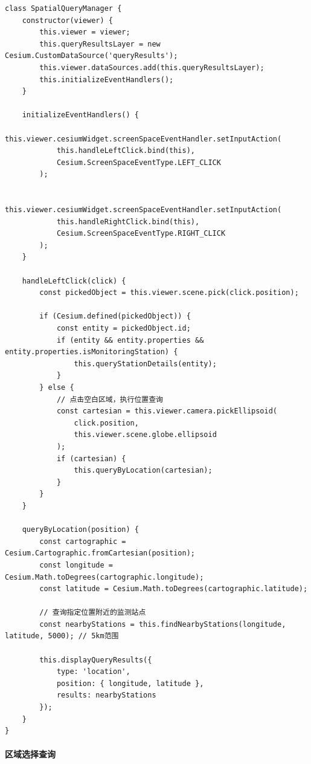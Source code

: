 \begin{lstlisting}
class SpatialQueryManager {
    constructor(viewer) {
        this.viewer = viewer;
        this.queryResultsLayer = new Cesium.CustomDataSource('queryResults');
        this.viewer.dataSources.add(this.queryResultsLayer);
        this.initializeEventHandlers();
    }
    
    initializeEventHandlers() {
        this.viewer.cesiumWidget.screenSpaceEventHandler.setInputAction(
            this.handleLeftClick.bind(this),
            Cesium.ScreenSpaceEventType.LEFT_CLICK
        );
        
        this.viewer.cesiumWidget.screenSpaceEventHandler.setInputAction(
            this.handleRightClick.bind(this),
            Cesium.ScreenSpaceEventType.RIGHT_CLICK
        );
    }
    
    handleLeftClick(click) {
        const pickedObject = this.viewer.scene.pick(click.position);
        
        if (Cesium.defined(pickedObject)) {
            const entity = pickedObject.id;
            if (entity && entity.properties && entity.properties.isMonitoringStation) {
                this.queryStationDetails(entity);
            }
        } else {
            // 点击空白区域，执行位置查询
            const cartesian = this.viewer.camera.pickEllipsoid(
                click.position, 
                this.viewer.scene.globe.ellipsoid
            );
            if (cartesian) {
                this.queryByLocation(cartesian);
            }
        }
    }
    
    queryByLocation(position) {
        const cartographic = Cesium.Cartographic.fromCartesian(position);
        const longitude = Cesium.Math.toDegrees(cartographic.longitude);
        const latitude = Cesium.Math.toDegrees(cartographic.latitude);
        
        // 查询指定位置附近的监测站点
        const nearbyStations = this.findNearbyStations(longitude, latitude, 5000); // 5km范围
        
        this.displayQueryResults({
            type: 'location',
            position: { longitude, latitude },
            results: nearbyStations
        });
    }
}
\end{lstlisting}

\paragraph{区域选择查询}\label{ux533aux57dfux9009ux62e9ux67e5ux8be2}

